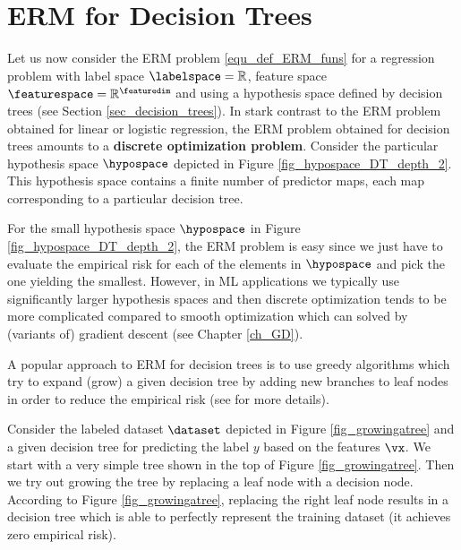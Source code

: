 \documentclass[12pt]{report}
\begin{document}
\section{ERM for Decision Trees}
\label{sec_ERM_decision_tree}

Let us now consider the ERM problem \eqref{equ_def_ERM_funs} for a regression problem with label 
space $\labelspace=\mathbb{R}$, feature space $\featurespace= \mathbb{R}^{\featuredim}$ and using 
a hypothesis space defined by decision trees (see Section \ref{sec_decision_trees}). In stark contrast 
to the ERM problem obtained for linear or logistic regression, the ERM problem obtained for decision 
trees amounts to a {\bf discrete optimization problem}. Consider the particular hypothesis space 
$\hypospace$ depicted in Figure \ref{fig_hypospace_DT_depth_2}. This hypothesis space contains a 
finite number of predictor maps, each map corresponding to a particular decision tree. 

For the small hypothesis space $\hypospace$ in Figure \ref{fig_hypospace_DT_depth_2}, the ERM 
problem is easy since we just have to evaluate the empirical risk for each of the elements in $\hypospace$ 
and pick the one yielding the smallest. However, in ML applications we typically use significantly 
larger hypothesis spaces and then discrete optimization tends to be more complicated compared 
to smooth optimization which can solved by (variants of) gradient descent (see Chapter \ref{ch_GD}). 

A popular approach to ERM for decision trees is to use greedy algorithms which try to expand (grow) 
a given decision tree by adding new branches to leaf nodes in order to reduce the empirical risk 
(see \cite[Chapter 8]{IntroSLR} for more details). 

\begin{center}
\end{center}

Consider the labeled dataset $\dataset$ depicted in Figure \ref{fig_growingatree} and a given decision tree for 
predicting the label $y$ based on the features $\vx$. We start with a very simple tree shown in the top of 
Figure \ref{fig_growingatree}. Then we try out growing the tree by replacing a leaf node with a decision node. 
According to Figure \ref{fig_growingatree}, replacing the right leaf node results in a decision tree which is 
able to perfectly represent the training dataset (it achieves zero empirical risk). 
 
\end{document}
